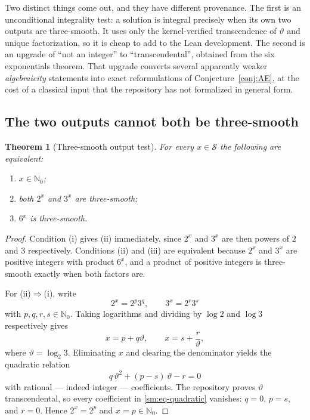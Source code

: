 \documentclass[11pt,oneside]{article}
\newtheorem{theorem}{Theorem}[section]
\theoremstyle{definition}
\theoremstyle{remark}
\newcommand{\Nzero}{\mathbb N_0}
\newcommand{\thetaq}{\vartheta}
\newcommand{\Sol}{\mathcal S}
\begin{document}
Two distinct things come out, and they have different provenance.  The first is an
unconditional integrality test: a solution is integral precisely when its own two outputs
are three-smooth.  It uses only the kernel-verified transcendence of $\thetaq$ and unique
factorization, so it is cheap to add to the Lean development.  The second is an upgrade of
``not an integer'' to ``transcendental'', obtained from the six exponentials theorem.  That
upgrade converts several apparently weaker \emph{algebraicity} statements into exact
reformulations of Conjecture~\ref{conj:AE}, at the cost of a classical input that the
repository has not formalized in general form.

\subsection{The two outputs cannot both be three-smooth}

\begin{theorem}[Three-smooth output test]
\label{sm:output-smooth}
For every $x\in\Sol$ the following are equivalent:
\begin{enumerate}[label=\textup{(\roman*)}]
\item $x\in\Nzero$;
\item both $2^x$ and $3^x$ are three-smooth;
\item $6^x$ is three-smooth.
\end{enumerate}
\end{theorem}

\begin{proof}
Condition (i) gives (ii) immediately, since $2^x$ and $3^x$ are then powers of $2$ and $3$
respectively.  Conditions (ii) and (iii) are equivalent because $2^x$ and $3^x$ are positive
integers with product $6^x$, and a product of positive integers is three-smooth exactly when
both factors are.

For (ii)$\Rightarrow$(i), write
\[
 2^x=2^p3^q,\qquad 3^x=2^r3^s
\]
with $p,q,r,s\in\Nzero$.  Taking logarithms and dividing by $\log2$ and $\log3$ respectively
gives
\[
 x=p+q\thetaq,\qquad x=s+\frac{r}{\thetaq},
\]
where $\thetaq=\log_2 3$.  Eliminating $x$ and clearing the denominator yields the quadratic
relation
\begin{equation}
 q\,\thetaq^{2}+(p-s)\,\thetaq-r=0
 \label{sm:eq-quadratic}
\end{equation}
with rational --- indeed integer --- coefficients.  The repository proves $\thetaq$
transcendental, so every coefficient in \eqref{sm:eq-quadratic} vanishes: $q=0$, $p=s$, and
$r=0$.  Hence $2^x=2^p$ and $x=p\in\Nzero$.
\end{proof}
\end{document}
